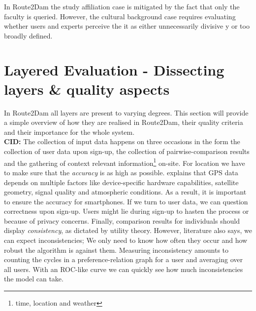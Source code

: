\documentclass[11pt,a4paper,oneside]{article}
\begin{document}
In Route2Dam the study affiliation case is mitigated by the fact that only the faculty is queried. However, the cultural background case requires evaluating whether users and experts perceive the it as either unnecessarily divisive y or too broadly defined.

\section{Layered Evaluation - Dissecting layers \& quality aspects}
In Route2Dam all layers are present to varying degrees. This section will provide a simple overview of how they are realised in Route2Dam, their quality criteria and their importance for the whole system.\\ 
\textbf{CID:} The collection of input data happens on three occasions in the form the collection of user data upon sign-up, the collection of pairwise-comparison results and the gathering of context relevant information\footnote{time, location and weather} on-site. For location we have to make sure that the \emph{accuracy} is as high as possible. \citeauthor{CITE-GPS-GOV}\parencite[as cited in]{CITE-Diggelen} explains that GPS data depends on multiple factors like device-specific hardware capabilities, satellite geometry, signal quality and atmospheric conditions. As a result, it is important to ensure the accuracy for smartphones.\cite{CITE-GPS-GOV} If we turn to user data, we can question correctness upon sign-up. Users might lie during sign-up to hasten the process or because of privacy concerns.\cite{CITE} Finally, comparison results for individuals should display \emph{consistency}, as dictated by utility theory.\cite{CITE} However, literature also says, we can expect inconsistencies;\cite{CITE-Stanford} We only need to know how often they occur and how robust the algorithm is against them. Measuring inconsistency amounts to counting the cycles in a preference-relation graph for a user and averaging over all users. With an ROC-like curve we can quickly see how much inconsistencies the model can take.\\
\end{document}

